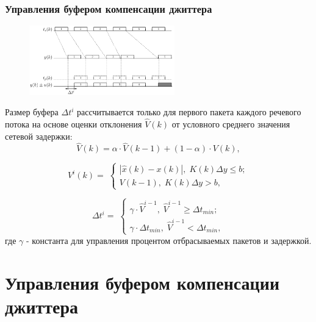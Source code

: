 \documentclass[10pt,pdf,hyperref={unicode}]{beamer}
\begin{document}
\begin{frame}
\frametitle{Управления буфером компенсации джиттера}

\begin{scriptsize}
\begin{figure}[!h]
\centering
\includegraphics[height=3cm]{timing_buffer.png}
\label{fig:man_5}
\end{figure}

Размер буфера $\Delta t^i$ рассчитывается только для первого пакета каждого речевого потока на основе оценки отклонения $\hat V (k)$ от условного среднего значения сетевой задержки:
\begin{equation}\label{eq41:syntes3}
\hat{V}(k)=\alpha\cdot\hat{V}(k-1)+(1-\alpha)\cdot V(k),
\end{equation}

\begin{equation}\label{eq41:syntes4}
V^i(k)= \;
\begin{cases}
| \hat{x}(k)-x(k) |, \; K(k)\Delta y \leq b; \\    
V(k-1), \;  K(k)\Delta y > b,    
\end{cases}
\end{equation}

\begin{equation}\label{eq41:syntes5}
\Delta t^i= \;
\begin{cases}
\gamma\cdot\hat{V}^{i-1}, \; \hat{V}^{i-1} \geq \Delta t_{min}; \\    
\gamma\cdot\Delta t_{min}, \;  \hat{V}^{i-1} < \Delta t_{min},    
\end{cases}
\end{equation}
\noindent где $\gamma$ - константа для управления процентом отбрасываемых пакетов и задержкой.
\end{scriptsize}

\end{frame}

\section{Управления буфером компенсации джиттера}
\end{document}
